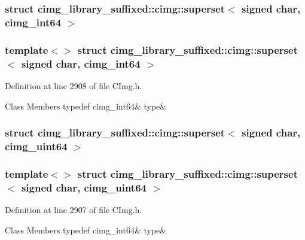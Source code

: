 \subsubsection{struct cimg\+\_\+library\+\_\+suffixed\+:\+:cimg\+:\+:superset$<$ signed char, cimg\+\_\+int64 $>$}
\subsubsection*{template$<$$>$\newline
struct cimg\+\_\+library\+\_\+suffixed\+::cimg\+::superset$<$ signed char, cimg\+\_\+int64 $>$}



Definition at line 2908 of file C\+Img.\+h.

\begin{DoxyFields}{Class Members}
\mbox{\label{namespacecimg__library__suffixed_1_1cimg_a8222f6fc102add376a86fe763462f325}} 
typedef cimg\_int64&
type&
\\
\hline

\end{DoxyFields}
\label{structcimg__library__suffixed_1_1cimg_1_1superset_3_01signed_01char_00_01cimg__uint64_01_4}
\subsubsection{struct cimg\+\_\+library\+\_\+suffixed\+:\+:cimg\+:\+:superset$<$ signed char, cimg\+\_\+uint64 $>$}
\subsubsection*{template$<$$>$\newline
struct cimg\+\_\+library\+\_\+suffixed\+::cimg\+::superset$<$ signed char, cimg\+\_\+uint64 $>$}



Definition at line 2907 of file C\+Img.\+h.

\begin{DoxyFields}{Class Members}
\mbox{\label{namespacecimg__library__suffixed_1_1cimg_a0a42782ab2e78aa22f0078bc3e3182df}} 
typedef cimg\_int64&
type&
\\
\hline

\end{DoxyFields}
\label{structcimg__library__suffixed_1_1cimg_1_1superset_3_01signed_01char_00_01double_01_4}
